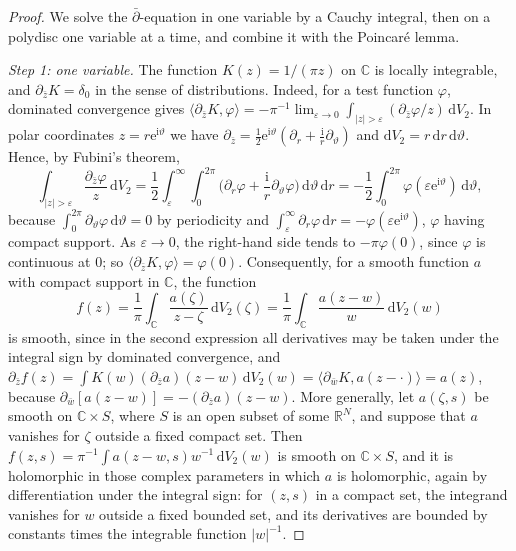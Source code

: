 \begin{proof}
We solve the $\bar\partial$-equation in one variable by a Cauchy integral, then on a polydisc one variable at a time, and combine it with the Poincar\'e lemma.

\emph{Step 1: one variable.} The function $K(z)=1/(\pi z)$ on $\mathbb C$ is locally integrable, and $\partial_{\bar z}K=\delta_0$ in the sense of distributions. Indeed, for a test function $\varphi$, dominated convergence gives $\langle\partial_{\bar z}K,\varphi\rangle=-\pi^{-1}\lim_{\varepsilon\to0}\int_{|z|>\varepsilon}(\partial_{\bar z}\varphi/z)\,\mathrm dV_2$. In polar coordinates $z=r\mathrm e^{\mathrm i\vartheta}$ we have $\partial_{\bar z}=\frac12\mathrm e^{\mathrm i\vartheta}(\partial_r+\frac{\mathrm i}r\partial_\vartheta)$ and $\mathrm dV_2=r\,\mathrm dr\,\mathrm d\vartheta$. Hence, by Fubini's theorem,
\[
 \int_{|z|>\varepsilon}\frac{\partial_{\bar z}\varphi}{z}\,\mathrm dV_2=\frac12\int_\varepsilon^\infty\!\!\int_0^{2\pi}\Big(\partial_r\varphi+\frac{\mathrm i}r\partial_\vartheta\varphi\Big)\,\mathrm d\vartheta\,\mathrm dr=-\frac12\int_0^{2\pi}\varphi(\varepsilon\mathrm e^{\mathrm i\vartheta})\,\mathrm d\vartheta,
\]
because $\int_0^{2\pi}\partial_\vartheta\varphi\,\mathrm d\vartheta=0$ by periodicity and $\int_\varepsilon^\infty\partial_r\varphi\,\mathrm dr=-\varphi(\varepsilon\mathrm e^{\mathrm i\vartheta})$, $\varphi$ having compact support. As $\varepsilon\to0$, the right-hand side tends to $-\pi\varphi(0)$, since $\varphi$ is continuous at $0$; so $\langle\partial_{\bar z}K,\varphi\rangle=\varphi(0)$. Consequently, for a smooth function $a$ with compact support in $\mathbb C$, the function
\[
 f(z)=\frac1\pi\int_{\mathbb C}\frac{a(\zeta)}{z-\zeta}\,\mathrm dV_2(\zeta)=\frac1\pi\int_{\mathbb C}\frac{a(z-w)}{w}\,\mathrm dV_2(w)
\]
is smooth, since in the second expression all derivatives may be taken under the integral sign by dominated convergence, and $\partial_{\bar z}f(z)=\int K(w)(\partial_{\bar z}a)(z-w)\,\mathrm dV_2(w)=\langle\partial_{\bar w}K,a(z-\cdot)\rangle=a(z)$, because $\partial_{\bar w}[a(z-w)]=-(\partial_{\bar z}a)(z-w)$. More generally, let $a(\zeta,s)$ be smooth on $\mathbb C\times S$, where $S$ is an open subset of some $\mathbb R^N$, and suppose that $a$ vanishes for $\zeta$ outside a fixed compact set. Then $f(z,s)=\pi^{-1}\int a(z-w,s)w^{-1}\,\mathrm dV_2(w)$ is smooth on $\mathbb C\times S$, and it is holomorphic in those complex parameters in which $a$ is holomorphic, again by differentiation under the integral sign: for $(z,s)$ in a compact set, the integrand vanishes for $w$ outside a fixed bounded set, and its derivatives are bounded by constants times the integrable function $|w|^{-1}$.


\end{proof}
